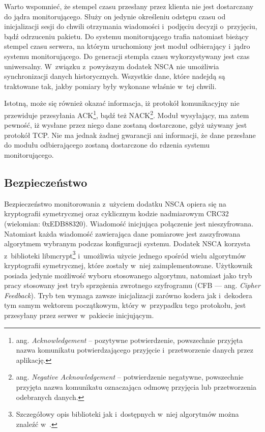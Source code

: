 Warto wspomnieć, że stempel czasu przesłany przez klienta nie jest
dostarczany do jądra monitorującego. Służy on jedynie określeniu
odstępu czasu od inicjalizacji sesji do chwili otrzymania wiadomości
i~podjęciu decyzji o~przyjęciu, bądź odrzuceniu pakietu. Do systemu
monitorującego trafia natomiast bieżący stempel czasu serwera, na
którym uruchomiony jest moduł odbierający i~jądro systemu
monitorującego. Do generacji stempla czasu wykorzystywany jest czas
uniwersalny. W~związku z~powyższym dodatek NSCA nie umożliwia
synchronizacji danych historycznych. Wszystkie dane, które nadejdą są
traktowane tak, jakby pomiary były wykonane właśnie w~tej chwili.

Istotną, może się również okazać informacja, iż protokół komunikacyjny
nie przewiduje przesyłania ACK\footnote {ang. {\em Acknowledgement} --
  pozytywne potwierdzenie, powszechnie przyjęta nazwa komunikatu
  potwierdzającego przyjęcie i~przetworzenie danych przez aplikację.},
bądź też NACK\footnote{ang. {\em Negative Acknowledgement} --
  potwierdzenie negatywne, powszechnie przyjęta nazwa komunikatu
  oznaczająca odmowę przyjęcia lub przetworzenia odebranych
  danych.}. Moduł wysyłający, ma zatem pewność, iż wysłane przez niego
dane zostaną dostarczone, gdyż używany jest protokół TCP.  Nie ma
jednak żadnej gwarancji ani informacji, że dane przesłane do modułu
odbierającego zostaną dostarczone do rdzenia systemu monitorującego.

\subsection[Bezpieczeństwo][Bezpieczeństwo]{Bezpieczeństwo}

Bezpieczeństwo monitorowania z~użyciem dodatku NSCA opiera się na
kryptografii symetrycznej oraz cyklicznym kodzie nadmiarowym CRC32
(wielomian: 0xEDB88320). Wiadomość inicjująca połączenie jest
nieszyfrowana. Natomiast każda wiadomość zawierająca dane pomiarowe
jest zaszyfrowana algorytmem wybranym podczas konfiguracji
systemu. Dodatek NSCA korzysta z~biblioteki
libmcrypt\footnote{Szczegółowy opis biblioteki jak i~dostępnych w~niej
  algorytmów można znaleźć w~\cite{www:libmcrypt}.} i~umożliwia użycie
jednego spośród wielu algorytmów kryptografii symetrycznej, które
zostały w~niej zaimplementowane. Użytkownik posiada jedynie możliwość
wyboru stosowanego algorytmu, natomiast jako tryb pracy stosowany jest
tryb sprzężenia zwrotnego szyfrogramu (CFB --- ang. {\em Cipher
  Feedback}). Tryb ten wymaga zawsze inicjalizacji zarówno kodera jak
i~dekodera tym samym wektorem początkowym, który w~przypadku tego
protokołu, jest przesyłany przez serwer w~pakiecie inicjującym.

